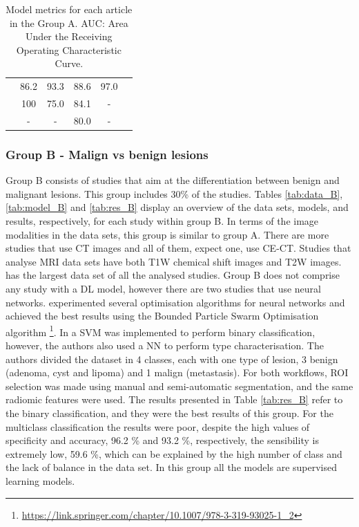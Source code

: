 \documentclass{article}
\begin{document}
\begin{table}[]
\begin{tabular}{cccccc}
        \cite{Schieda2017}                  & 86.2                                       & 93.3                                       & 88.6                                    & 97.0                               \\
        \cite{Tu2020}                       & 100                                        & 75.0                                       & 84.1                                    & -                                  \\
        \cite{Romeo2018}                    & -                                          & -                                          & 80.0                                    & -                                  \\
        \bottomrule
    \end{tabular}
    \caption{Model metrics for each article in the Group A. AUC: Area Under the Receiving Operating Characteristic Curve.}
    \label{tab:res_A}
\end{table}

\subsubsection{Group B - Malign vs benign lesions}

Group B consists of studies that aim at the differentiation between benign and
malignant lesions. This group includes 30\% of the studies. Tables
\ref{tab:data_B}, \ref{tab:model_B} and \ref{tab:res_B} display an overview of
the data sets, models, and results, respectively, for each study within group B.
In terms of the image modalities in the data sets, this group is similar to
group A. There are more studies that use CT images and all of them, expect one,
use CE-CT. Studies that analyse MRI data sets have both T1W chemical shift
images and T2W images. \cite{Shoemaker2018} has the largest data set of all the
analysed studies. Group B does not comprise any study with a DL model, however
there are two studies that use neural networks. \cite{Koyuncu2019} experimented
several optimisation algorithms for neural networks and achieved the best
results using the Bounded Particle Swarm Optimisation algorithm
\footnote{ \href{https://link.springer.com/chapter/10.1007/978-3-319-93025-1\_2}{https://link.springer.com/chapter/10.1007/978-3-319-93025-1\_2}}.
In \cite{Barstugan2020} a SVM was implemented to perform binary classification,
however, the authors also used a NN to perform type characterisation. The
authors divided the dataset in 4 classes, each with one type of lesion, 3 benign
(adenoma, cyst and lipoma) and 1 malign (metastasis). For both workflows, ROI
selection was made using manual and semi-automatic segmentation, and the same
radiomic features were used. The results presented in Table \ref{tab:res_B}
refer to the binary classification, and they were the best results of this
group. For the multiclass classification the results were poor, despite the high
values of specificity and accuracy, 96.2 \% and 93.2 \%, respectively, the
sensibility is extremely low, 59.6 \%, which can be explained by the high number
of class and the lack of balance in the data set. In this group all the models
are supervised learning models.
\end{document}
